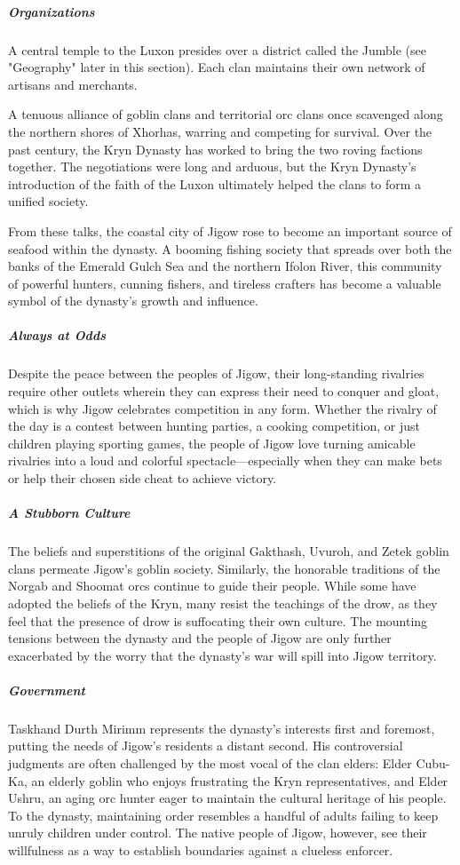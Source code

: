 \documentclass[10pt,a4paper,twoside,bg=print,twocolumn,openany,nodeprecatedcode]{dndbook}
\begin{document}
\subparagraph{Organizations}
A central temple to the Luxon presides over a district called the Jumble (see "Geography" later in this section). Each clan maintains their own network of artisans and merchants.

A tenuous alliance of goblin clans and territorial orc clans once scavenged along the northern shores of Xhorhas, warring and competing for survival. Over the past century, the Kryn Dynasty has worked to bring the two roving factions together. The negotiations were long and arduous, but the Kryn Dynasty's introduction of the faith of the Luxon ultimately helped the clans to form a unified society.

From these talks, the coastal city of Jigow rose to become an important source of seafood within the dynasty. A booming fishing society that spreads over both the banks of the Emerald Gulch Sea and the northern Ifolon River, this community of powerful hunters, cunning fishers, and tireless crafters has become a valuable symbol of the dynasty's growth and influence.

\subparagraph{Always at Odds}
Despite the peace between the peoples of Jigow, their long-standing rivalries require other outlets wherein they can express their need to conquer and gloat, which is why Jigow celebrates competition in any form. Whether the rivalry of the day is a contest between hunting parties, a cooking competition, or just children playing sporting games, the people of Jigow love turning amicable rivalries into a loud and colorful spectacle—especially when they can make bets or help their chosen side cheat to achieve victory.

\subparagraph{A Stubborn Culture}
The beliefs and superstitions of the original Gakthash, Uvuroh, and Zetek goblin clans permeate Jigow's goblin society. Similarly, the honorable traditions of the Norgab and Shoomat orcs continue to guide their people. While some have adopted the beliefs of the Kryn, many resist the teachings of the drow, as they feel that the presence of drow is suffocating their own culture. The mounting tensions between the dynasty and the people of Jigow are only further exacerbated by the worry that the dynasty's war will spill into Jigow territory.

\subparagraph{Government}
Taskhand Durth Mirimm represents the dynasty's interests first and foremost, putting the needs of Jigow's residents a distant second. His controversial judgments are often challenged by the most vocal of the clan elders: Elder Cubu-Ka, an elderly goblin who enjoys frustrating the Kryn representatives, and Elder Ushru, an aging orc hunter eager to maintain the cultural heritage of his people. To the dynasty, maintaining order resembles a handful of adults failing to keep unruly children under control. The native people of Jigow, however, see their willfulness as a way to establish boundaries against a clueless enforcer.
\end{document}
